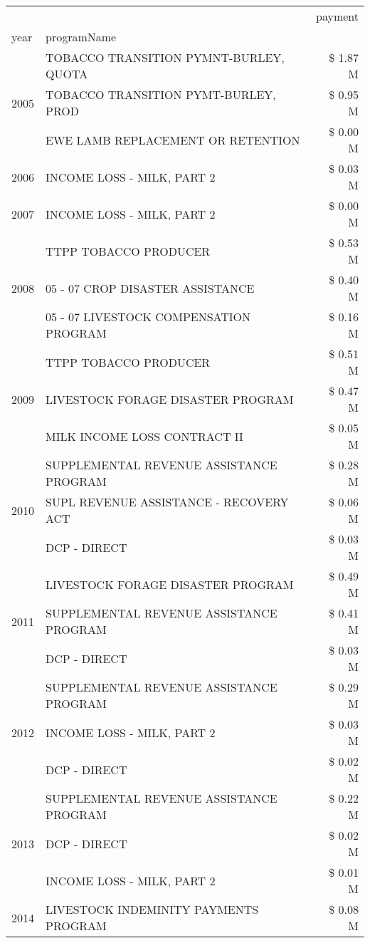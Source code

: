 \begin{tabular}{llr}
\toprule
 &  & payment \\
year & programName &  \\
\midrule
\multirow[t]{3}{*}{2005} & TOBACCO TRANSITION PYMNT-BURLEY, QUOTA & \$ 1.87 M \\
 & TOBACCO TRANSITION PYMT-BURLEY, PROD & \$ 0.95 M \\
 & EWE LAMB REPLACEMENT OR RETENTION & \$ 0.00 M \\
\cline{1-3}
2006 & INCOME LOSS - MILK, PART 2 & \$ 0.03 M \\
\cline{1-3}
2007 & INCOME LOSS - MILK, PART 2 & \$ 0.00 M \\
\cline{1-3}
\multirow[t]{3}{*}{2008} & TTPP TOBACCO PRODUCER & \$ 0.53 M \\
 & 05 - 07 CROP DISASTER ASSISTANCE & \$ 0.40 M \\
 & 05 - 07 LIVESTOCK COMPENSATION PROGRAM & \$ 0.16 M \\
\cline{1-3}
\multirow[t]{3}{*}{2009} & TTPP TOBACCO PRODUCER & \$ 0.51 M \\
 & LIVESTOCK FORAGE DISASTER  PROGRAM & \$ 0.47 M \\
 & MILK INCOME LOSS CONTRACT II & \$ 0.05 M \\
\cline{1-3}
\multirow[t]{3}{*}{2010} & SUPPLEMENTAL REVENUE ASSISTANCE PROGRAM & \$ 0.28 M \\
 & SUPL REVENUE ASSISTANCE - RECOVERY ACT & \$ 0.06 M \\
 & DCP - DIRECT & \$ 0.03 M \\
\cline{1-3}
\multirow[t]{3}{*}{2011} & LIVESTOCK FORAGE DISASTER PROGRAM & \$ 0.49 M \\
 & SUPPLEMENTAL REVENUE ASSISTANCE PROGRAM & \$ 0.41 M \\
 & DCP - DIRECT & \$ 0.03 M \\
\cline{1-3}
\multirow[t]{3}{*}{2012} & SUPPLEMENTAL REVENUE ASSISTANCE PROGRAM & \$ 0.29 M \\
 & INCOME LOSS - MILK, PART 2 & \$ 0.03 M \\
 & DCP - DIRECT & \$ 0.02 M \\
\cline{1-3}
\multirow[t]{3}{*}{2013} & SUPPLEMENTAL REVENUE ASSISTANCE PROGRAM & \$ 0.22 M \\
 & DCP - DIRECT & \$ 0.02 M \\
 & INCOME LOSS - MILK, PART 2 & \$ 0.01 M \\
\cline{1-3}
\multirow[t]{3}{*}{2014} & LIVESTOCK INDEMINITY PAYMENTS PROGRAM & \$ 0.08 M \\

\end{tabular}

